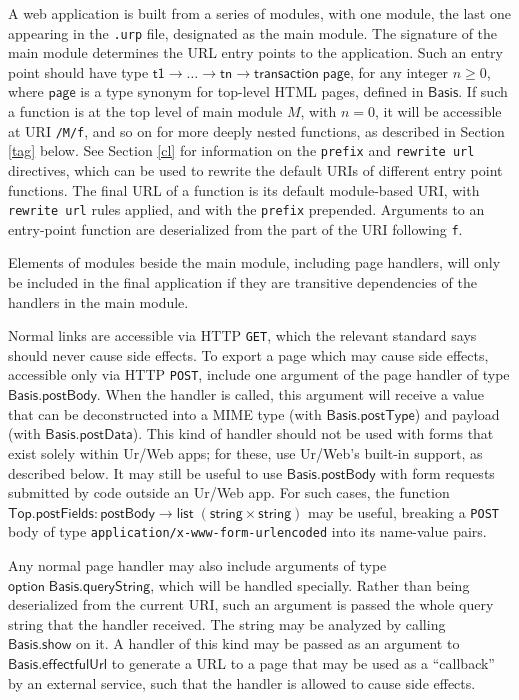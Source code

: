 \documentclass{article}
\newcommand{\mt}[1]{\mathsf{#1}}
\begin{document}
A web application is built from a series of modules, with one module, the last one appearing in the \texttt{.urp} file, designated as the main module.  The signature of the main module determines the URL entry points to the application.  Such an entry point should have type $\mt{t1} \to \ldots \to \mt{tn} \to \mt{transaction} \; \mt{page}$, for any integer $n \geq 0$, where $\mt{page}$ is a type synonym for top-level HTML pages, defined in $\mt{Basis}$.  If such a function is at the top level of main module $M$, with $n = 0$, it will be accessible at URI \texttt{/M/f}, and so on for more deeply nested functions, as described in Section \ref{tag} below.  See Section \ref{cl} for information on the \texttt{prefix} and \texttt{rewrite url} directives, which can be used to rewrite the default URIs of different entry point functions.  The final URL of a function is its default module-based URI, with \texttt{rewrite url} rules applied, and with the \texttt{prefix} prepended.  Arguments to an entry-point function are deserialized from the part of the URI following \texttt{f}.

Elements of modules beside the main module, including page handlers, will only be included in the final application if they are transitive dependencies of the handlers in the main module.

Normal links are accessible via HTTP \texttt{GET}, which the relevant standard says should never cause side effects.  To export a page which may cause side effects, accessible only via HTTP \texttt{POST}, include one argument of the page handler of type $\mt{Basis.postBody}$.  When the handler is called, this argument will receive a value that can be deconstructed into a MIME type (with $\mt{Basis.postType}$) and payload (with $\mt{Basis.postData}$).  This kind of handler should not be used with forms that exist solely within Ur/Web apps; for these, use Ur/Web's built-in support, as described below.  It may still be useful to use $\mt{Basis.postBody}$ with form requests submitted by code outside an Ur/Web app.  For such cases, the function $\mt{Top.postFields} : \mt{postBody} \to \mt{list} \; (\mt{string} \times \mt{string})$ may be useful, breaking a \texttt{POST} body of type \texttt{application/x-www-form-urlencoded} into its name-value pairs.

Any normal page handler may also include arguments of type $\mt{option \; Basis.queryString}$, which will be handled specially.  Rather than being deserialized from the current URI, such an argument is passed the whole query string that the handler received.  The string may be analyzed by calling $\mt{Basis.show}$ on it.  A handler of this kind may be passed as an argument to $\mt{Basis.effectfulUrl}$ to generate a URL to a page that may be used as a ``callback'' by an external service, such that the handler is allowed to cause side effects.
\end{document}
